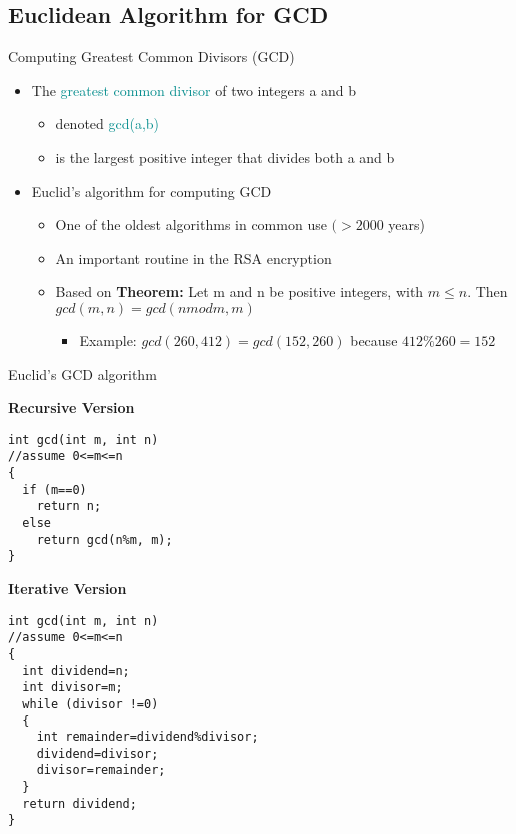 


\subsection{Euclidean Algorithm for GCD}
\item Computing Greatest Common Divisors (GCD)
  \begin{itemize}
  \item The \textcolor{DarkCyan}{greatest common divisor} of two integers a and b
    \begin{itemize}
    \item denoted \textcolor{DarkCyan}{gcd(a,b)}
    \item is the largest positive integer that divides both a and b
    \end{itemize}
  \item Euclid's algorithm for computing GCD
    \begin{itemize}
    \item One of the oldest algorithms in common use $(>2000$ years)
    \item An important routine in the RSA encryption
    \item Based on \textbf{Theorem:} Let m and n be positive integers, with $m\leq n$. Then $gcd(m,n)=gcd(n mod m,m)$
      \begin{itemize}
      \item Example: $gcd(260,412)=gcd(152,260)$ because $412\%260=152$
      \end{itemize}
    \end{itemize}
  \end{itemize}
\item Euclid's GCD algorithm \\
\noindent\begin{minipage}[t]{0.5\textwidth} %
\textbf{Recursive Version}
\begin{lstlisting}
int gcd(int m, int n)
//assume 0<=m<=n
{
  if (m==0)
    return n;
  else
    return gcd(n%m, m);
}
\end{lstlisting}
\end{minipage}
\begin{minipage}[t]{0.5\textwidth} %
\textbf{Iterative Version}
\begin{lstlisting}
int gcd(int m, int n)
//assume 0<=m<=n
{
  int dividend=n;
  int divisor=m;
  while (divisor !=0)
  {
    int remainder=dividend%divisor;
    dividend=divisor;
    divisor=remainder;
  }
  return dividend;
}
\end{lstlisting}
\end{minipage}
